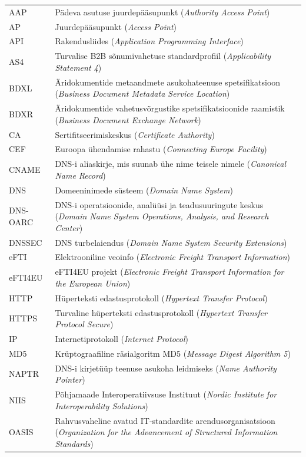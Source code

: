 \begin{longtable}{p{3cm}p{10cm}}
AAP&Pädeva asutuse juurdepääsupunkt (\textit{Authority Access Point})\\
AP&Juurdepääsupunkt (\textit{Access Point})\\
API&Rakendusliides (\textit{Application Programming Interface})\\
AS4&Turvalise B2B sõnumivahetuse standardprofiil (\textit{Applicability Statement 4})\\
BDXL&Äridokumentide metaandmete asukohateenuse spetsifikatsioon (\textit{Business Document Metadata Service Location})\\
BDXR&Äridokumentide vahetusvõrgustike spetsifikatsioonide raamistik (\textit{Business Document Exchange Network})\\
CA&Sertifitseerimiskeskus (\textit{Certificate Authority})\\
CEF&Euroopa ühendamise rahastu (\textit{Connecting Europe Facility})\\
CNAME&DNS-i aliaskirje, mis suunab ühe nime teisele nimele (\textit{Canonical Name Record})\\
DNS&Domeeninimede süsteem (\textit{Domain Name System})\\
DNS-OARC&DNS-i operatsioonide, analüüsi ja teadusuuringute keskus (\textit{Domain Name System Operations, Analysis, and Research Center})\\
DNSSEC&DNS turbelaiendus (\textit{Domain Name System Security Extensions})\\
eFTI&Elektrooniline veoinfo (\textit{Electronic Freight Transport Information})\\
eFTI4EU&eFTI4EU projekt (\textit{Electronic Freight Transport Information for the European Union})\\
HTTP&Hüperteksti edastusprotokoll (\textit{Hypertext Transfer Protocol})\\
HTTPS&Turvaline hüperteksti edastusprotokoll (\textit{Hypertext Transfer Protocol Secure})\\
IP&Internetiprotokoll (\textit{Internet Protocol})\\
MD5&Krüptograafiline räsialgoritm MD5 (\textit{Message Digest Algorithm 5})\\
NAPTR&DNS-i kirjetüüp teenuse asukoha leidmiseks (\textit{Name Authority Pointer})\\
NIIS&Põhjamaade Interoperatiivsuse Instituut (\textit{Nordic Institute for Interoperability Solutions})\\
OASIS&Rahvusvaheline avatud IT-standardite arendusorganisatsioon (\textit{Organization for the Advancement of Structured Information Standards})\\

\end{longtable}
